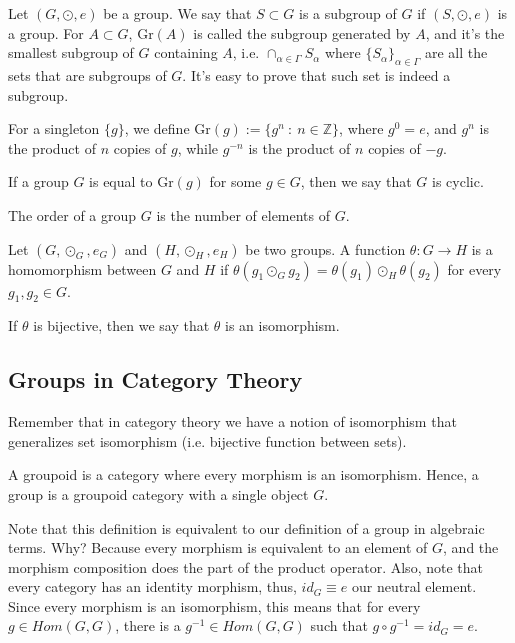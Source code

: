 \begin{definition}
	Let $(G, \odot, e)$ be a group. We say that $S\subset G$ is a
	subgroup of $G$ if $(S, \odot, e)$ is a group.
	For $A \subset G$, $\text{Gr}(A)$ is called the subgroup generated by $A$,
	and it's the smallest subgroup of $G$ containing $A$, i.e.
	$\cap_{\alpha \in \Gamma} S_\alpha$ where $\{S_\alpha\}_{\alpha \in \Gamma}$ are
	all the sets that are subgroups of $G$.
	It's easy to prove that such set is indeed a subgroup.

	For a singleton $\{g\}$, we define
	$\text{Gr}(g) := \{g^n \ : \ n \in \mathbb Z\}$, where
	$g^0 = e$, and $g^n$ is the product of $n$ copies of $g$,
	while $g^{-n}$ is the product of $n$ copies of $-g$.
\end{definition}

\begin{definition}
	If a group $G$ is equal to $\text{Gr}(g)$ for some $g \in G$,
	then we say that $G$ is cyclic.
\end{definition}

\begin{definition}
	The order of a group $G$ is the number of elements of $G$.
\end{definition}

\begin{definition}
	Let $(G, \odot_G, e_G)$ and $(H, \odot_H, e_H)$ be two groups. A function
	$\theta:G \to H$ is a homomorphism between $G$ and $H$ if
	$\theta(g_1 \odot_G g_2) = \theta(g_1) \odot_H \theta(g_2)$
	for every $g_1, g_2 \in G$.

	If $\theta$ is bijective, then we say that $\theta$
	is an isomorphism.
\end{definition}

\subsection{Groups in Category Theory}

Remember that in category theory we have a notion of isomorphism
that generalizes set isomorphism (i.e. bijective function between sets).

\begin{definition}
	A groupoid is a category where every morphism is an isomorphism.
	Hence, a group is a groupoid category with a single object $G$.
\end{definition}

Note that this definition is equivalent to our definition of
a group in algebraic terms. Why? Because every morphism
is equivalent to an element of $G$, and the morphism composition
does the part of the product operator. Also, note that
every category has an identity morphism, thus,
$id_G \equiv e$ our neutral element. Since every morphism
is an isomorphism, this means that for every $g \in Hom(G,G)$,
there is a $g^{-1} \in Hom(G,G)$ such that $g \circ g^{-1} = id_G = e$.
